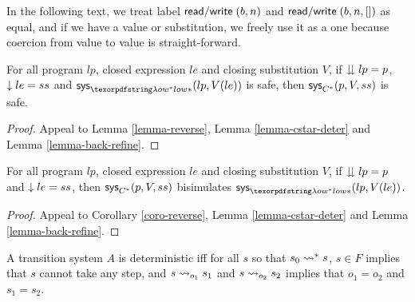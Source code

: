 In the following text, we treat label $\text{\textsf{read}}/\text{\textsf{write}}\;(b,n)$ and $\text{\textsf{read}}/\text{\textsf{write}}\;(b,n,[])$ as equal, and if we have a \lamstar value or substitution, we freely use it as a \cstar one because coercion from \lamstar value to \cstar value is straight-forward.

\begin{theorem}[Safety] \label{thm-safety}
  For all \lamstar program $lp$, closed expression $le$ and closing substitution $V$, if $\downdownarrows lp=p$, $\downarrow le=ss$ and $\sys_{\lamstar}(lp,V(le))$ is safe, then $\sys_{\cstar}(p, V, ss)$ is safe.
\end{theorem}
\begin{proof}
Appeal to Lemma \ref{lemma-reverse}, Lemma \ref{lemma-cstar-deter} and Lemma \ref{lemma-back-refine}.
\end{proof}

\begin{theorem}[Bisimulation] \label{thm-bisim}
  For all \lamstar program $lp$, closed expression $le$ and closing substitution $V$, if $\downdownarrows lp=p$ and $\downarrow le=ss$, then $\sys_{\cstar}(p, V, ss)$ bisimulates $\sys_{\lamstar}(lp,V(le))$.
\end{theorem}
\begin{proof}
Appeal to Corollary \ref{coro-reverse}, Lemma \ref{lemma-cstar-deter} and Lemma \ref{lemma-back-refine}.
\end{proof}

\begin{definition}[Determinism] \label{def-deter}
  A transition system $A$ is deterministic iff for all $s$ so that $s_0\leadsto^* s$, $s\in F$ implies that $s$ cannot take any step, and $s\leadsto_{o_1} s_1$ and $s\leadsto_{o_2} s_2$ implies that $o_1 = o_2$ and $s_1 = s_2$.
\end{definition}

